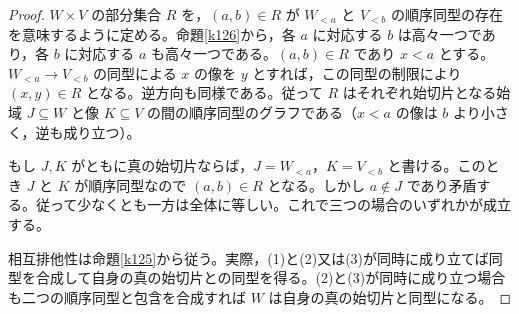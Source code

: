 \documentclass[a5paper,10pt,dvipdfmx]{jsarticle}
\theoremstyle{definition}
\theoremstyle{plain}
\begin{document}
\begin{proof}
$W\times V$ の部分集合 $R$ を，$(a,b)\in R$ が $W_{<a}$ と $V_{<b}$ の順序同型の存在を意味するように定める。命題\ref{k126}から，各 $a$ に対応する $b$ は高々一つであり，各 $b$ に対応する $a$ も高々一つである。$(a,b)\in R$ であり $x<a$ とする。$W_{<a}\to V_{<b}$ の同型による $x$ の像を $y$ とすれば，この同型の制限により $(x,y)\in R$ となる。逆方向も同様である。従って $R$ はそれぞれ始切片となる始域 $J\subseteq W$ と像 $K\subseteq V$ の間の順序同型のグラフである（$x<a$ の像は $b$ より小さく，逆も成り立つ）。

もし $J,K$ がともに真の始切片ならば，$J=W_{<a}$，$K=V_{<b}$ と書ける。このとき $J$ と $K$ が順序同型なので $(a,b)\in R$ となる。しかし $a\notin J$ であり矛盾する。従って少なくとも一方は全体に等しい。これで三つの場合のいずれかが成立する。

相互排他性は命題\ref{k125}から従う。実際，(1)と(2)又は(3)が同時に成り立てば同型を合成して自身の真の始切片との同型を得る。(2)と(3)が同時に成り立つ場合も二つの順序同型と包含を合成すれば $W$ は自身の真の始切片と同型になる。
\end{proof}
\end{document}
